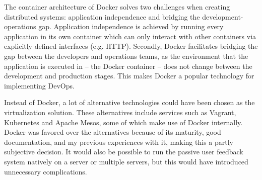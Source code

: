 


The container architecture of Docker solves two challenges when creating distributed systems: application independence and bridging the development-operations gap.
Application independence is achieved by running every application in its own container which can only interact with other containers via explicitly defined interfaces (e.g. HTTP).
Secondly, Docker facilitates bridging the gap between the developers and operations teams, as the environment that the application is executed in -- the Docker container -- does not change between the development and production stages.
This makes Docker a popular technology for implementing DevOps.

Instead of Docker, a lot of alternative technologies could have been chosen as the virtualization solution.
These alternatives include services such as Vagrant, Kubernetes and Apache Mesos, some of which make use of Docker internally.
Docker was favored over the alternatives because of its maturity, good documentation, and my previous experiences with it, making this a partly subjective decision.
It would also be possible to run the passive user feedback system natively on a server or multiple servers, but this would have introduced unnecessary complications.